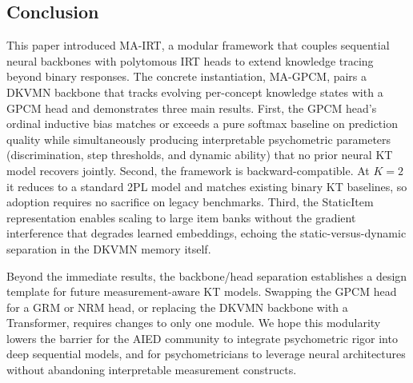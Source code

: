 \documentclass[pdflatex,sn-apa]{sn-jnl}
\begin{document}
\subsection{Conclusion}
\label{sec:conclusion}
This paper introduced MA-IRT, a modular framework that couples sequential neural backbones with polytomous IRT heads to extend knowledge tracing beyond binary responses. The concrete instantiation, MA-GPCM, pairs a DKVMN backbone that tracks evolving per-concept knowledge states with a GPCM head and demonstrates three main results. First, the GPCM head's ordinal inductive bias matches or exceeds a pure softmax baseline on prediction quality while simultaneously producing interpretable psychometric parameters (discrimination, step thresholds, and dynamic ability) that no prior neural KT model recovers jointly. Second, the framework is backward-compatible. At $K=2$ it reduces to a standard 2PL model and matches existing binary KT baselines, so adoption requires no sacrifice on legacy benchmarks. Third, the StaticItem representation enables scaling to large item banks without the gradient interference that degrades learned embeddings, echoing the static-versus-dynamic separation in the DKVMN memory itself.

Beyond the immediate results, the backbone/head separation establishes a design template for future measurement-aware KT models. Swapping the GPCM head for a GRM or NRM head, or replacing the DKVMN backbone with a Transformer, requires changes to only one module. We hope this modularity lowers the barrier for the AIED community to integrate psychometric rigor into deep sequential models, and for psychometricians to leverage neural architectures without abandoning interpretable measurement constructs.


\backmatter


\end{document}

